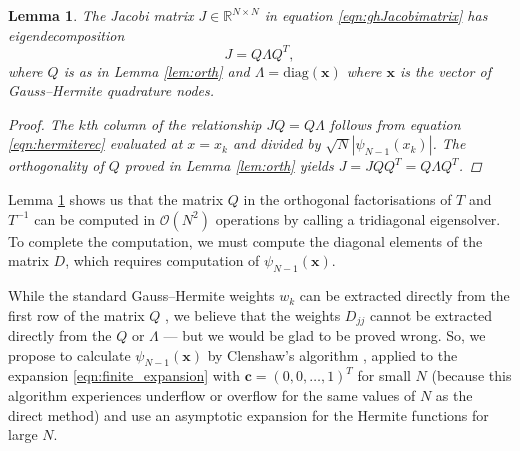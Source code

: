 \documentclass[10pt]{article}
\numberwithin{theorem}{section}
\newtheorem{lemma}[theorem]{Lemma}
\begin{document}
\begin{lemma}\label{lem:jacobi}
    The Jacobi matrix $J\in\mathbb{R}^{N\times N}$ in equation \eqref{eqn:ghJacobimatrix} has eigendecomposition
    $$
    J = Q\Lambda Q^T,
    $$
    where $Q$ is as in Lemma \ref{lem:orth} and $\Lambda = \mathrm{diag}(\mathbf{x})$ where $\mathbf{x}$ is the vector of Gauss--Hermite quadrature nodes.
    \begin{proof}
The $k$th column of the relationship $JQ = Q\Lambda$ follows from equation \eqref{eqn:hermiterec} evaluated at $x = x_k$ and divided by $\sqrt{N}|\psi_{N{-}1}(x_k)|$. The orthogonality of $Q$ proved in Lemma \ref{lem:orth} yields $J = JQQ^T = Q\Lambda Q^T$.
    \end{proof}
\end{lemma}

Lemma \ref{lem:jacobi} shows us that the matrix $Q$ in the orthogonal factorisations of $T$ and $T^{-1}$ can be computed in $\mathcal{O}(N^2)$ operations by calling a tridiagonal eigensolver. To complete the computation, we must compute the diagonal elements of the matrix $D$, which requires computation of $\psi_{N{-}1}(\mathbf{x})$.

While the standard Gauss--Hermite weights $w_k$ can be extracted directly from the first row of the matrix $Q$ \cite{golub1969calculation}, we believe that the weights $D_{jj}$ cannot be extracted directly from the $Q$ or $\Lambda$ --- but we would be glad to be proved wrong. So, we propose to calculate $\psi_{N-1}(\mathbf{x})$ by Clenshaw's algorithm \cite{clenshaw1955note}, \cite[§2.7]{olver2020fast} applied to the expansion \eqref{eqn:finite_expansion} with $\mathbf{c} = (0,0,\ldots,1)^T$ for small $N$ (because this algorithm experiences underflow or overflow for the same values of $N$ as the direct method) and use an asymptotic expansion for the Hermite functions for large $N$.
\end{document}
